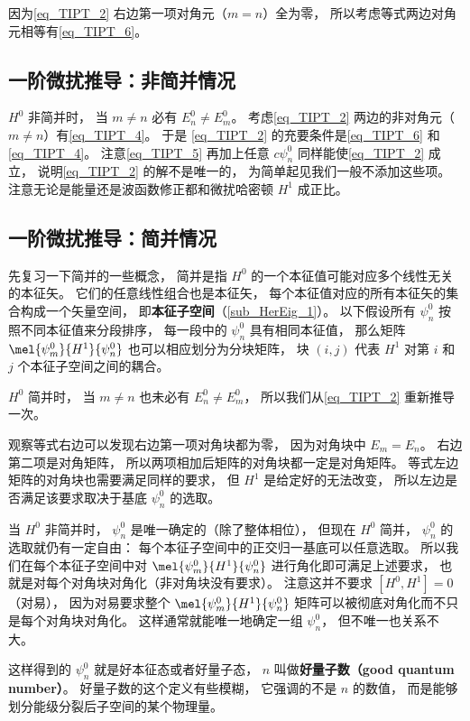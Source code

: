 因为\autoref{eq_TIPT_2} 右边第一项对角元（$m = n$）全为零， 所以考虑等式两边对角元相等有\autoref{eq_TIPT_6}。

\subsection{一阶微扰推导：非简并情况}\label{sub_TIPT_1}
$H^0$ 非简并时， 当 $m\ne n$ 必有 $E_n^0 \ne E_m^0$。  考虑\autoref{eq_TIPT_2} 两边的非对角元（$m \ne n$）有\autoref{eq_TIPT_4}。 于是 \autoref{eq_TIPT_2} 的充要条件是\autoref{eq_TIPT_6} 和\autoref{eq_TIPT_4}。 注意\autoref{eq_TIPT_5} 再加上任意 $c \psi_n^0$ 同样能使\autoref{eq_TIPT_2} 成立， 说明\autoref{eq_TIPT_2} 的解不是唯一的， 为简单起见我们一般不添加这些项。 注意无论是能量还是波函数修正都和微扰哈密顿 $H^1$ 成正比。

\subsection{一阶微扰推导：简并情况}
先复习一下简并的一些概念， 简并是指 $H^0$ 的一个本征值可能对应多个线性无关的本征矢。 它们的任意线性组合也是本征矢， 每个本征值对应的所有本征矢的集合构成一个矢量空间， 即\textbf{本征子空间}（\autoref{sub_HerEig_1}）。 以下假设所有 $\psi_n^0$ 按照不同本征值来分段排序， 每一段中的 $\psi_n^0$ 具有相同本征值， 那么矩阵 $\mel{\psi_m^0}{H^1}{\psi_n^0}$ 也可以相应划分为分块矩阵， 块 $(i,j)$ 代表 $H^1$ 对第 $i$ 和 $j$ 个本征子空间之间的耦合。

$H^0$ 简并时， 当 $m\ne n$ 也未必有 $E_n^0 \ne E_m^0$， 所以我们从\autoref{eq_TIPT_2} 重新推导一次。

观察等式右边可以发现右边第一项对角块都为零， 因为对角块中 $E_m = E_n$。 右边第二项是对角矩阵， 所以两项相加后矩阵的对角块都一定是对角矩阵。 等式左边矩阵的对角块也需要满足同样的要求， 但 $H^1$ 是给定好的无法改变， 所以左边是否满足该要求取决于基底 $\psi_n^0$ 的选取。

当 $H^0$ 非简并时， $\psi_n^0$ 是唯一确定的（除了整体相位）， 但现在 $H^0$ 简并， $\psi_n^0$ 的选取就仍有一定自由： 每个本征子空间中的正交归一基底可以任意选取。 所以我们在每个本征子空间中对 $\mel{\psi_m^0}{H^1}{\psi_n^0}$ 进行角化即可满足上述要求， 也就是对每个对角块对角化（非对角块没有要求）。 注意这并不要求 $[H^0, H^1] = 0$ （对易）， 因为对易要求整个 $\mel{\psi_m^0}{H^1}{\psi_n^0}$ 矩阵可以被彻底对角化而不只是每个对角块对角化。 这样通常就能唯一地确定一组 $\psi_n^0$， 但不唯一也关系不大。

这样得到的 $\psi_n^0$ 就是好本征态或者好量子态， $n$ 叫做\textbf{好量子数（good quantum number）}。 好量子数的这个定义有些模糊， 它强调的不是 $n$ 的数值， 而是能够划分能级分裂后子空间的某个物理量。

